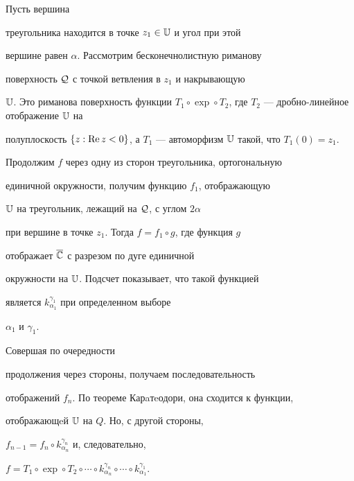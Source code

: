 \begin{pf}


Пусть вершина


треугольника находится в точке $z_1\in \Bbb U$ и угол при этой


вершине равен $\alpha$. Рассмотрим бесконечнолистную риманову


поверхность $\cal Q$ с точкой ветвления в $z_1$ и накрывающую


$\Bbb U$. Это риманова поверхность функции $T_1\circ\exp\circ


T_2$, где $T_2$ --- дробно-линейное отображение $\Bbb U$ на


полуплоскость $\{z:\re z<0\}$, а $T_1$ --- автоморфизм $\Bbb


U$ такой, что $T_1(0)=z_1$.





Продолжим $f$ через одну из сторон треугольника, ортогональную


единичной окружности, получим функцию $f_1$, отображающую


$\Bbb U$ на треугольник, лежащий на $\cal Q$, с углом $2\alpha$


при вершине в точке $z_1$. Тогда $f=f_1\circ g$, где функция $g$


отображает $\overline{\Bbb{C}}$ с разрезом по дуге единичной


окружности на $\Bbb U$. Подсчет показывает, что такой функцией


является $k_{\alpha_1}^{\gamma_1}$ при определенном выборе


$\alpha_1$ и $\gamma_1$.





Совершая по очередности


продолжения через стороны, получаем последовательность


отображений $f_n$. По теореме Карaтeодори, она сходится к функции,


отображающeй $\Bbb U$ на $Q$. Но, с другой стороны,


$f_{n-1}=f_{n}\circ k_{\alpha_n}^{\gamma_n}$ и, следовательно,


$f=T_1\circ\exp\circ T_2\circ\dotsb\circ


k_{\alpha_n}^{\gamma_n}\circ\dotsb\circ


k_{\alpha_1}^{\gamma_1}$.


\end{pf}








